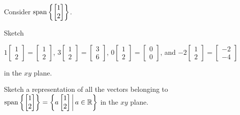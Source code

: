 \begin{activity}{10}
  Consider \(\operatorname{span}\left\{\begin{bmatrix}1\\2\end{bmatrix}\right\}\).
  \begin{subactivity}
    Sketch

    \(1\begin{bmatrix}1\\2\end{bmatrix}=\begin{bmatrix}1\\2\end{bmatrix}\),
    \hfill\(3\begin{bmatrix}1\\2\end{bmatrix}=\begin{bmatrix}3\\6\end{bmatrix}\),
    \hfill\(0\begin{bmatrix}1\\2\end{bmatrix}=\begin{bmatrix}0\\0\end{bmatrix}\),
    \hfill and \(-2\begin{bmatrix}1\\2\end{bmatrix}=\begin{bmatrix}-2\\-4\end{bmatrix}\) 

    in the \(xy\) plane.
  \end{subactivity}
  \begin{subactivity}
    Sketch a representation of all the vectors belonging to
    \(
      \operatorname{span}\left\{\begin{bmatrix}1\\2\end{bmatrix}\right\}
        =
      \left\{a\begin{bmatrix}1\\2\end{bmatrix}\,\middle|\,a\in\mathbb{R}\right\}
    \)
    in the \(xy\) plane.
  \end{subactivity}
\end{activity}





